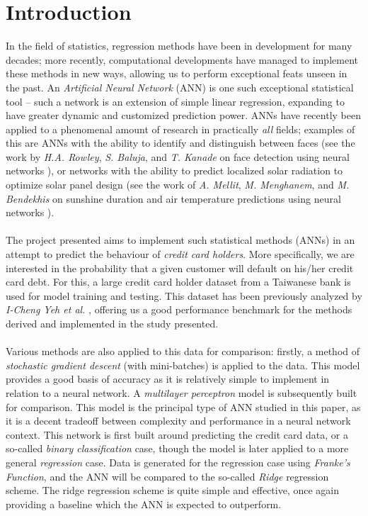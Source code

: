 \section{Introduction}
    In the field of statistics, regression methods have been in development for many decades; more recently, computational developments have managed to implement these methods in new ways, allowing us to perform exceptional feats unseen in the past. An \textit{Artificial Neural Network} (ANN) is one such exceptional statistical tool – such a network is an extension of simple linear regression, expanding to have greater dynamic and customized prediction power. ANNs have recently been applied to a phenomenal amount of research in practically \textit{all} fields; examples of this are ANNs with the ability to identify and distinguish between faces (see the work by \textit{H.A. Rowley}, \textit{S. Baluja}, and \textit{T. Kanade} on face detection using neural networks \cite{NNWfacedetection}), or networks with the ability to predict localized solar radiation to optimize solar panel design (see the work of \textit{A. Mellit}, \textit{M. Menghanem}, and \textit{M. Bendekhis} on sunshine duration and air temperature predictions using neural networks \cite{NNWsunshine}). \\\\
    The project presented aims to implement such statistical methods (ANNs) in an attempt to predict the behaviour of \textit{credit card holders}. More specifically, we are interested in the probability that a given customer will default on his/her credit card debt. For this, a large credit card holder dataset from a Taiwanese bank is used for model training and testing. This dataset has been previously analyzed by \textit{I-Cheng Yeh et al.} \cite{CCdata}, offering us a good performance benchmark for the methods derived and implemented in the study presented. \\\\
    Various methods are also applied to this data for comparison: firstly, a method of \textit{stochastic gradient descent} (with mini-batches) is applied to the data. This model provides a good basis of accuracy as it is relatively simple to implement in relation to a neural network. A \textit{multilayer perceptron} model is subsequently built for comparison. This model is the principal type of ANN studied in this paper, as it is a decent tradeoff between complexity and performance in a neural network context. This network is first built around predicting the credit card data, or a so-called \textit{binary classification} case, though the model is later applied to a more general \textit{regression} case. Data is generated for the regression case using \textit{Franke's Function}, and the ANN will be compared to the so-called \textit{Ridge} regression scheme. The ridge regression scheme is quite simple and effective, once again providing a baseline which the ANN is expected to outperform.\\\\

